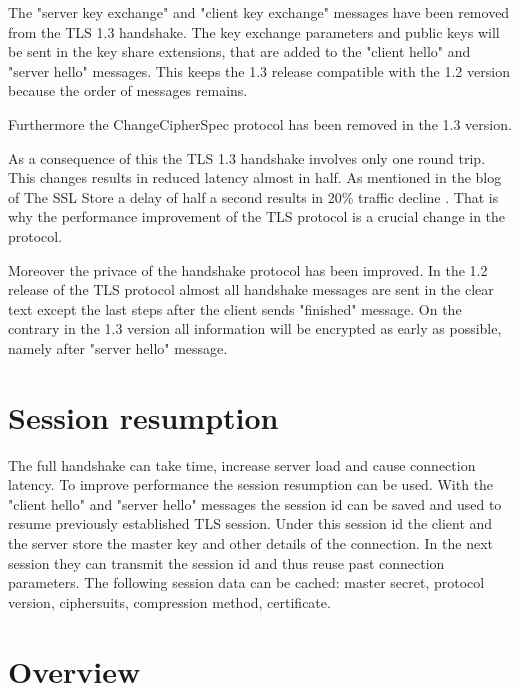 The "server key exchange" and "client key exchange" messages have been removed from the TLS 1.3 handshake. The key exchange parameters and public keys will be sent in the key share extensions, that are added to the "client hello" and "server hello" messages. This keeps the 1.3 release compatible with the 1.2 version because the order of messages remains.

Furthermore the ChangeCipherSpec protocol has been removed in the 1.3 version. 

As a consequence of this the TLS 1.3 handshake involves only one round trip. This changes results in reduced latency almost in half. As mentioned in the blog of The SSL Store a delay of half a second results in 20\% traffic decline \cite{sslstore:handshake}. That is why the performance improvement of the TLS protocol is a crucial change in the protocol.

Moreover the privace of the handshake protocol has been improved. In the 1.2 release of the TLS protocol almost all handshake messages are sent in the clear text except the last steps after the client sends "finished" message. On the contrary in the 1.3 version all information will be encrypted as early as possible, namely after "server hello" message. 

\section{Session resumption}
\label{sec:resumption}

The full handshake can take time, increase server load and cause connection latency. To improve performance the session resumption can be used. With the "client hello" and "server hello" messages the session id can be saved and used to resume previously established TLS session. Under this session id the client and the server store the master key and other details of the connection. In the next session they can transmit the session id and thus reuse past connection parameters. The following session data can be cached: master secret, protocol version, ciphersuits, compression method, certificate.





\section{Overview}
\label{sec:overview}

